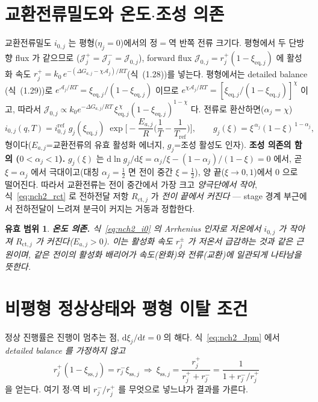 \documentclass[11pt,a4paper]{article}
\newtheorem*{boundbox}{유효 범위}
\newcommand{\dd}{\mathrm{d}}
\newcommand{\eq}{\mathrm{eq}}
\newcommand{\sstat}{\mathrm{ss}}
\newcommand{\ct}{\mathrm{ct}}
\begin{document}
\section{교환전류밀도와 온도$\cdot$조성 의존}\label{sec:nch2_i0}
교환전류밀도 $i_{0,j}$ 는 평형($\eta_j=0$)에서의 정$=$역 반쪽 전류 크기다. 평형에서 두 단방향 flux 가 같으므로
($\mathcal J_j^+=\mathcal J_j^-=\mathcal J_{0,j}$), forward flux $\mathcal J_{0,j}=r_j^+(1-\xi_{\eq,j})$ 에 활성화
속도 $r_j^+=k_0\,e^{-(\Delta G_{a,j}-\chi\mathcal A_j)/RT}$(식~(1.28))를 넣는다. 평형에서는 detailed balance
(식~(1.29))로 $e^{\mathcal A_j/RT}=\xi_{\eq,j}/(1-\xi_{\eq,j})$ 이므로 $e^{\chi\mathcal A_j/RT}=[\xi_{\eq,j}
/(1-\xi_{\eq,j})]^{\chi}$ 이고, 따라서 $\mathcal J_{0,j}\propto k_0e^{-\Delta G_{a,j}/RT}\,\xi_{\eq,j}^{\,\chi}
(1-\xi_{\eq,j})^{1-\chi}$ 다. 전류로 환산하면($\alpha_j=\chi$)
\begin{equation}
i_{0,j}(q,T)=i_{0,j}^{\mathrm{ref}}\;g_j(\xi_{\eq,j})\;\exp\!\Big[-\frac{E_{a,j}}{R}\Big(\frac1T-\frac1{T_{\mathrm{ref}}}\Big)\Big],
\qquad g_j(\xi)=\xi^{\,\alpha_j}(1-\xi)^{\,1-\alpha_j},
\label{eq:nch2_i0}
\end{equation}
형이다($E_{a,j}$=교환전류의 유효 활성화 에너지, $g_j$=조성 활성도 인자). \textbf{조성 의존의 함의
($0<\alpha_j<1$).} $g_j(\xi)$ 는 $\dd\ln g_j/\dd\xi=\alpha_j/\xi-(1-\alpha_j)/(1-\xi)=0$ 에서, 곧 $\xi=\alpha_j$
에서 극대이고(대칭 $\alpha_j=\tfrac12$ 면 전이 중간 $\xi=\tfrac12$), 양 끝($\xi\to0,1$)에서 $0$ 으로 떨어진다. 따라서
교환전류는 전이 중간에서 가장 크고 \emph{양극단에서 작아}, 식~\eqref{eq:nch2_rct} 로 전하전달 저항 $R_{\ct,j}$ 가
\emph{전이 끝에서 커진다} — stage 경계 부근에서 전하전달이 느려져 분극이 커지는 거동과 정합한다.
\begin{boundbox}
\textbf{온도 의존.} 식~\eqref{eq:nch2_i0} 의 Arrhenius 인자로 저온에서 $i_{0,j}$ 가 작아져 $R_{\ct,j}$ 가
커진다($E_{a,j}>0$). 이는 활성화 속도 $r_j^\pm$ 가 저온서 급감하는 것과 같은 근원이며, 같은 전이의 활성화
배리어가 \emph{속도}(완화)와 \emph{전류}(교환)에 일관되게 나타남을 뜻한다.
\end{boundbox}

\section{비평형 정상상태와 평형 이탈 조건}\label{sec:nch2_ss}
정상 진행률은 진행이 멈추는 점, $\dd\xi_j/\dd t=0$ 의 해다. 식~\eqref{eq:nch2_Jpm} 에서 \emph{detailed balance 를
가정하지 않고}
\begin{equation}
r_j^+(1-\xi_{\sstat,j})=r_j^-\xi_{\sstat,j}\ \Longrightarrow\
\xi_{\sstat,j}=\frac{r_j^+}{r_j^++r_j^-}=\frac{1}{1+r_j^-/r_j^+}
\label{eq:nch2_xiss}
\end{equation}
을 얻는다. 여기 정$\cdot$역 비 $r_j^-/r_j^+$ 를 무엇으로 넣느냐가 결과를 가른다.
\end{document}
